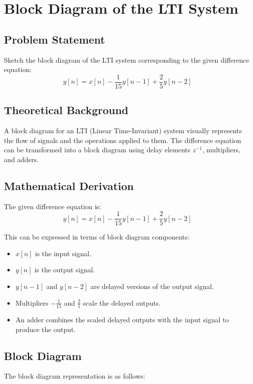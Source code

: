 \item[(a)]
\section{Block Diagram of the LTI System}

\subsection*{Problem Statement}
Sketch the block diagram of the LTI system corresponding to the given difference equation:
\[ y[n] = x[n] - \frac{1}{15} y[n-1] + \frac{2}{5} y[n-2] \]

\subsection*{Theoretical Background}
A block diagram for an LTI (Linear Time-Invariant) system visually represents the flow of signals and the operations applied to them. The difference equation can be transformed into a block diagram using delay elements \( z^{-1} \), multipliers, and adders.

\subsection*{Mathematical Derivation}
The given difference equation is:
\[ y[n] = x[n] - \frac{1}{15} y[n-1] + \frac{2}{5} y[n-2] \]

This can be expressed in terms of block diagram components:
\begin{itemize}
    \item \( x[n] \) is the input signal.
    \item \( y[n] \) is the output signal.
    \item \( y[n-1] \) and \( y[n-2] \) are delayed versions of the output signal.
    \item Multipliers \( -\frac{1}{15} \) and \( \frac{2}{5} \) scale the delayed outputs.
    \item An adder combines the scaled delayed outputs with the input signal to produce the output.
\end{itemize}

\subsection*{Block Diagram}
The block diagram representation is as follows:

